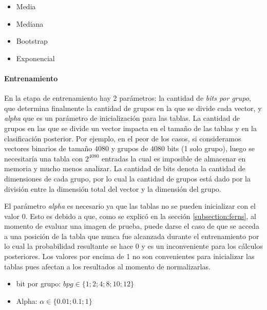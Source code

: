 	\begin{itemize}
		\item Media
		\item Mediana
		\item Bootstrap
		\item Exponencial
	\end{itemize}
	
	
	\paragraph{Entrenamiento}

	En la etapa de entrenamiento hay 2 parámetros: la cantidad de \textit{bits por grupo}, que determina finalmente la cantidad de grupos en la que se divide cada vector, y \textit{alpha} que es un parámetro de inicialización para las tablas. La cantidad de grupos en las que se divide un vector impacta en el tamaño de las tablas y en la clasificación posterior. Por ejemplo, en el peor de los casos, si consideramos vectores binarios de tamaño $4080$ y grupos de $4080$ bits (1 solo grupo), luego se necesitaría una tabla con $2^{4080}$ entradas la cual es imposible de almacenar en memoria y mucho menos analizar. La cantidad de bits denota la cantidad de dimensiones de cada grupo, por lo cual  la cantidad de grupos está dado por la división entre la dimensión total del vector y la dimensión del grupo.

	El parámetro \textit{alpha} es necesario ya que las tablas no se pueden inicializar con el valor $0$. Esto es debido a que, como se explicó en la sección \ref{subsection:ferns}, al momento de evaluar una imagen de prueba, puede darse el caso de que se acceda a una posición de la tabla que nunca fue alcanzada durante el entrenamiento por lo cual la probabilidad resultante se hace 0 y es un inconveniente para los cálculos posteriores. Los valores por encima de 1 no son convenientes para inicializar las tablas pues afectan a los resultados al momento de normalizarlas.

	\begin{itemize}
		\item bit por grupo: $ bpg \in \{ 1; 2; 4; 8; 10; 12 \}$
		\item Alpha: $ \alpha \in \{ 0.01; 0.1; 1 \}$
	\end{itemize}
